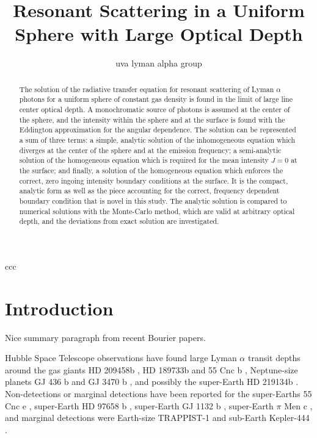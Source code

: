 \documentclass{aastex63}
\begin{document}
\title{Resonant Scattering in a Uniform Sphere with Large Optical Depth}




\author{uva lyman alpha group}


\begin{abstract}

The solution of the radiative transfer equation for resonant scattering of Lyman $\alpha$ photons for a uniform sphere of constant gas density is found in the limit of large line center optical depth. A monochromatic source of photons is assumed at the center of the sphere, and the intensity within the sphere and at the surface is found with the Eddington approximation for the angular dependence. The solution can be represented a sum of three terms: a simple, analytic solution of the inhomogeneous equation which diverges at the center of the sphere and at the emission frequency; a semi-analytic solution of the homogeneous equation which is required for the mean intensity $J=0$ at the surface; and finally, a solution of the homogeneous equation which enforces the correct, zero ingoing intensity boundary conditions at the surface. It is the compact, analytic form as well as the piece accounting for the correct, frequency dependent boundary condition that is novel in this study. The analytic solution is compared to numerical solutions with the Monte-Carlo method, which are valid at arbitrary optical depth, and the deviations from exact solution are investigated.

\end{abstract}


\keywords{}



ccc\section{Introduction} 
\label{sec:intro}

Nice summary paragraph from recent Bourier  papers.

Hubble Space Telescope observations have found large Lyman $\alpha$ transit depths around the gas giants HD 209458b \citep{2003Natur.422..143V}, HD 189733b \citep{2012A&A...543L...4L} and 55 Cnc b \citep{2012A&A...547A..18E}, Neptune-size planets GJ 436 b 
\citep{2015Natur.522..459E}
and GJ 3470 b \citep{2018A&A...620A.147B}, and possibly the super-Earth HD 219134b \citep{2019EPSC...13.1928L}.
Non-detections or marginal detections have been reported for the super-Earths 55 Cnc e \citep{2012A&A...547A..18E}, super-Earth HD 97658 b \citep{2017A&A...597A..26B} , super-Earth GJ 1132 b \citep{2019AJ....158...50W}, super-Earth $\pi$ Men c \citep{2020ApJ...888L..21G}, and marginal detections were  Earth-size TRAPPIST-1 \citep{2017A&A...599L...3B} and sub-Earth Kepler-444 \citep{2017A&A...602A.106B}.
\end{document}
